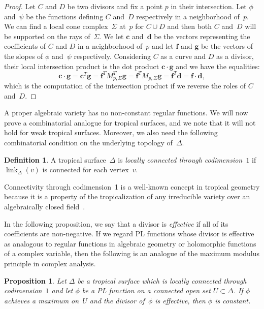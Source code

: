\documentclass[11pt]{amsart}
\newtheorem{prop}[thm]{Proposition}
\theoremstyle{definition}
\newtheorem{defn}[thm]{Definition}
\newcommand{\bff}{\mathbf f}
\newcommand{\defi}[1]{\emph{#1}}
\newcommand{\link}{\operatorname{link}}
\begin{document}
\begin{proof}
Let $C$ and $D$ be two divisors and fix a point $p$ in their intersection. Let
$\phi$ and~$\psi$ be the functions defining $C$ and~$D$ respectively in a
neighborhood of~$p$. We can find a local cone complex~$\Sigma$ at~$p$ for $C
\cup D$ and then both $C$ and~$D$ will be supported on the rays of~$\Sigma$. We
let $\mathbf c$ and~$\mathbf d$ be the vectors representing the coefficients of
$C$ and $D$ in a neighborhood of~$p$ and let $\bff$ and $\mathbf g$ be the
vectors of the slopes of $\phi$ and~$\psi$
respectively. Considering $C$ as a curve and
$D$ as a divisor,
their local intersection product is the dot product $\mathbf c \cdot \mathbf g$ and we have the
equalities:
\begin{equation*}
\mathbf c \cdot \mathbf g = 
\mathbf c^T \mathbf g = \mathbf f^T M_{p,\Sigma}^T \mathbf g =
\mathbf f^T M_{p,\Sigma} \mathbf g = \mathbf f^T \mathbf d =
\mathbf f \cdot \mathbf d,
\end{equation*}
which is the computation of the intersection product if we reverse the roles of
$C$ and~$D$.
\end{proof}

A proper algebraic variety has no non-constant regular functions. We will now
prove a combinatorial analogue for tropical surfaces, and we note that it will
not hold for weak tropical surfaces. Moreover, we also need the following
combinatorial condition on the underlying topology of~$\Delta$.

\begin{defn}
A tropical surface~$\Delta$ is \defi{locally connected through codimension~$1$}
if $\link_\Delta(v)$ is connected for each vertex~$v$.
\end{defn}

\noindent Connectivity through codimension~1 is a well-known concept in tropical
geometry because it is a property of the tropicalization of any irreducible
variety over an algebraically closed field~\cite{bjsst,cartwright-payne}.

In the following proposition, we say that a divisor is \defi{effective} if all
of its coefficients are non-negative. If we regard PL functions whose divisor is
effective as analogous to regular functions in algebraic geometry or holomorphic
functions of a complex variable, then the following is an analogue of the
maximum modulus principle in complex analysis.

\begin{prop}\label{prop:no-regular-local}
Let $\Delta$ be a tropical surface which is locally connected
through codimension~$1$ and let $\phi$ be a PL function on a connected open set
$U \subset \Delta$. If $\phi$ achieves a maximum on~$U$ and the divisor
of~$\phi$ is effective, then $\phi$ is constant.
\end{prop}
\end{document}
